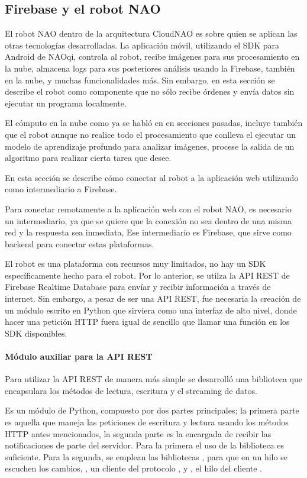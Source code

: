 \subsection{Firebase y el robot NAO}\label{\detokenize{firebase-nao-robot}}
El robot NAO dentro de la arquitectura CloudNAO es sobre quien se aplican las
otras tecnologías desarrolladas. La aplicación móvil, utilizando el SDK para Android de NAOqi,
controla al robot, recibe imágenes para sus procesamiento en la nube, almacena
logs para sus posteriores análisis usando la Firebase, también en la nube, y muchas
funcionalidades más. Sin embargo, en esta sección se describe el robot como componente
que no sólo recibe órdenes y envía datos sin ejecutar un programa localmente.

El cómputo en la nube como ya se habló en en secciones pasadas, incluye también
que el robot aunque no realice todo el procesamiento que conlleva el ejecutar
un modelo de aprendizaje profundo para analizar imágenes, procese la salida
de un algoritmo para realizar cierta tarea que desee.

En esta sección se describe cómo conectar al robot a la aplicación web utilizando
como intermediario a Firebase.

Para conectar remotamente a la aplicación web con el robot NAO, es necesario
un intermediario, ya que se quiere que la conexión no sea dentro de una misma red
y la respuesta sea inmediata, Ese intermediario es Firebase, que sirve como
backend para conectar estas plataformas.

El robot es una plataforma con recursos muy limitados, no hay un SDK
específicamente hecho para el robot. Por lo anterior, se utilza la API REST
de Firebase Realtime Database para envíar y recibir información a través de
internet. Sin embargo, a pesar de ser una API REST, fue necesaria la creación
de un módulo escrito en Python que sirviera como una interfaz de alto nivel,
donde hacer una petición HTTP fuera igual de sencillo que llamar una función en
los SDK disponibles.


\paragraph{Módulo auxiliar para la API REST}
\label{\detokenize{nao_firebase:modulo-auxiliar-para-la-api-rest}}
Para utilizar la API REST de manera más simple se desarrolló una biblioteca
que encapsulara los métodos de lectura, escritura y el streaming de datos.

Es un módulo de Python, compuesto por dos partes principales; la primera parte
es aquella que maneja las peticiones de escritura y lectura usando los métodos
HTTP antes mencionados, la segunda parte es la encargada de recibir las
notificaciones de parte del servidor. Para la primera el uso de la biblioteca
 es suficiente. Para la segunda, se emplean las bibliotecas
, para que en un hilo se escuchen los cambios, ,
un cliente del protocolo , y , el hilo del cliente .

